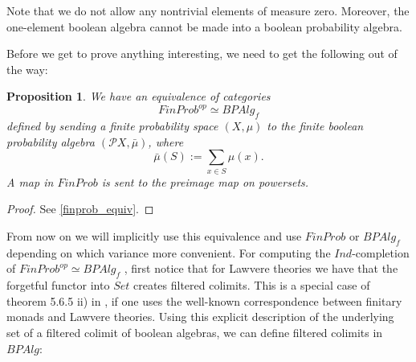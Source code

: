 \documentclass[a4paper]{amsproc}
\theoremstyle{plain}
\newtheorem{proposition}[theorem]{Proposition}
\theoremstyle{definition}
\theoremstyle{remark}
\numberwithin{equation}{section}
\begin{document}

Note that we do not allow any nontrivial elements of measure zero. Moreover, the one-element boolean algebra cannot be made into a boolean probability algebra.

Before we get to prove anything interesting, we need to get the following out of the way:

\begin{proposition} We have an equivalence of categories
\[
FinProb^{op} \simeq BPAlg_f
\]
defined by sending a finite probability space $(X, \mu)$ to the finite boolean probability algebra $(\mathcal{P} X, \bar{\mu})$, where
\[
\bar{\mu}(S) := \sum_{x \in S} \mu(x).
\]
A map in $FinProb$ is sent to the preimage map on powersets.
\end{proposition}
\begin{proof}
See \ref{finprob_equiv}.
\end{proof}

From now on we will implicitly use this equivalence and use $FinProb$ or $BPAlg_f$ depending on which variance more convenient.
For computing the $Ind$-completion of $FinProb^{op} \simeq BPAlg_f$ , first notice that for Lawvere theories we have that the forgetful functor into $Set$ creates filtered colimits. This is a special case of theorem 5.6.5 ii) in \cite{riehl}, if one uses the well-known correspondence between finitary monads and Lawvere theories. Using this explicit description of the underlying set of a filtered colimit of boolean algebras, we can define filtered colimits in $BPAlg$:
\end{document}
